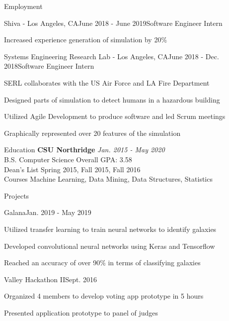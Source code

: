 \documentclass{resume}
\begin{document}
\begin{rSection}{Employment}
\begin{rSubsection}{Shiva - Los Angeles, CA}{June 2018 - June 2019}{Software Engineer Intern}{}
        \item Increased experience generation of simulation by 20\%
    \end{rSubsection}
    \begin{rSubsection}{Systems Engineering Research Lab - Los Angeles, CA}{June 2018 - Dec. 2018}{Software Engineer Intern}{}
        \item SERL collaborates with the US Air Force and LA Fire Department
        \item Designed parts of simulation to detect humans in a hazardous building
        \item Utilized Agile Development to produce software and led Scrum meetings
        \item Graphically represented over 20 features of the simulation
    \end{rSubsection}
\end{rSection}

\begin{rSection}{Education}
    {\bf CSU Northridge} \hfill {\em Jan. 2015 - May 2020} 
    \\ B.S. Computer Science \hfill { Overall GPA: 3.58 }
    \\ Dean's List \hfill {Spring 2015, Fall 2015, Fall 2016}
    \\ Courses \hfill {Machine Learning, Data Mining, Data Structures, Statistics}
\end{rSection}

\begin{rSection}{Projects}
    \begin{rSubsection}{Galana}{Jan. 2019 - May 2019}{}{}
        \item Utilized transfer learning to train neural networks to identify galaxies
        \item Developed convolutional neural networks using Keras and Tensorflow
        \item Reached an accuracy of over 90\% in terms of classifying galaxies
    \end{rSubsection}
    \begin{rSubsection}{Valley Hackathon II}{Sept. 2016}{}{}
        \item Organized 4 members to develop voting app prototype in 5 hours
        \item Presented application prototype to panel of judges
    \end{rSubsection}
\end{rSection}
\end{document}
